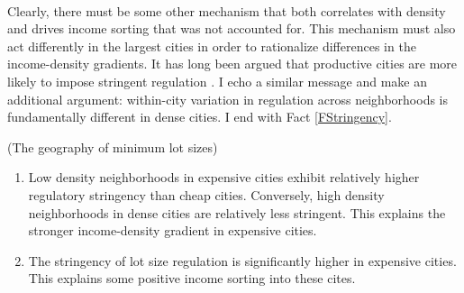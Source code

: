 \documentclass[11pt]{article}
\begin{document}
	\paragraph*{} 
	Clearly, there must be some other mechanism that both correlates with density and drives income sorting that was not accounted for. This mechanism must also act differently in the largest cities in order to rationalize differences in the income-density gradients. It has long been argued that productive cities are more likely to impose stringent regulation \citep{HILBER2013,parkho, durantonpugaurbgrowth}. I echo a similar message and make an additional argument: within-city variation in regulation across neighborhoods is fundamentally different in dense cities. I end with Fact \ref{FStringency}. 

	\begin{Fact}\label{FStringency}
		(The geography of minimum lot sizes)
		\begin{enumerate}
			\item  Low density neighborhoods in expensive cities exhibit relatively higher regulatory stringency than cheap cities. Conversely, high density neighborhoods in dense cities are relatively less stringent. This explains the stronger income-density gradient in expensive cities. 		
			\item  The stringency of lot size regulation is significantly higher in expensive cities. This explains some positive income sorting into these cites. 
		\end{enumerate}
	\end{Fact}
	
\end{document}
